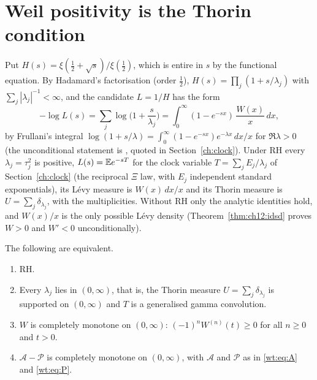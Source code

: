 \section{Weil positivity is the Thorin condition}\label{wt:sec:thorin}

Put $H(s)=\xi(\frac12+\sqrt s)/\xi(\frac12)$, which is entire in $s$ by the functional equation. By Hadamard's factorisation (order $\frac12$), $H(s)=\prod_j(1+s/\lambda_j)$ with $\sum_j|\lambda_j|^{-1}<\infty$, and the candidate $L=1/H$ has the form
\[
-\log L(s)=\sum_j\log\Big(1+\frac s{\lambda_j}\Big)=\int_0^\infty(1-e^{-sx})\,\frac{W(x)}x\,dx,
\]
by Frullani's integral $\log(1+s/\lambda)=\int_0^\infty(1-e^{-sx})e^{-\lambda x}\,dx/x$ for $\Re\lambda>0$ (the unconditional statement is \cite[Theorem 4.3]{P26}, quoted in Section~\ref{ch:clock}). Under RH every $\lambda_j=\tau_j^2$ is positive, $L(s)=\mathbb{E} e^{-sT}$ for the clock variable $T=\sum_jE_j/\lambda_j$ of Section~\ref{ch:clock} (the reciprocal $\Xi$ law, with $E_j$ independent standard exponentials), its L\'evy measure is $W(x)\,dx/x$ and its Thorin measure is $U=\sum_j\delta_{\lambda_j}$, with the multiplicities. Without RH only the analytic identities hold, and $W(x)/x$ is the only possible L\'evy density (Theorem~\ref{thm:ch12:idsd} proves $W>0$ and $W'<0$ unconditionally).

\begin{theorem}\label{wt:thm:main}
The following are equivalent.
\begin{enumerate}
\item[(i)] RH.
\item[(ii)] Every $\lambda_j$ lies in $(0,\infty)$, that is, the Thorin measure $U=\sum_j\delta_{\lambda_j}$ is supported on $(0,\infty)$ and $T$ is a generalised gamma convolution.
\item[(iii)] $W$ is completely monotone on $(0,\infty)$: $(-1)^nW^{(n)}(t)\ge0$ for all $n\ge0$ and $t>0$.
\item[(iv)] $\mathcal A-\mathcal P$ is completely monotone on $(0,\infty)$, with $\mathcal A$ and $\mathcal P$ as in \eqref{wt:eq:A} and \eqref{wt:eq:P}.
\end{enumerate}
\end{theorem}

